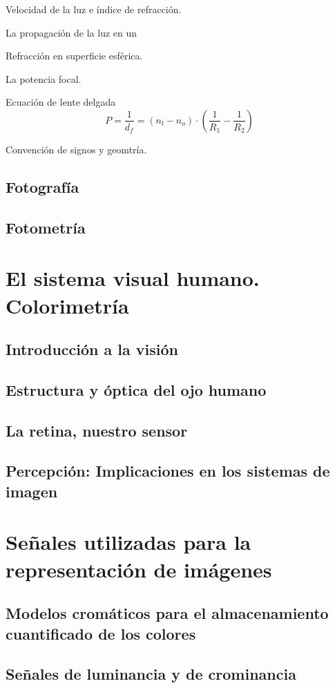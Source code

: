 \documentclass[a4paper]{book}
\begin{document}
Velocidad de la luz e índice de refracción.

La propagación de la luz en un

Refracción en superficie esférica.

La potencia focal.

Ecuación de lente delgada
\[ P=\frac{1}{d_f}=\left( n_l-n_o \right) \cdot \left( \frac{1}{R_1} - \frac{1}{R_2}  \right)  \]

Convención de signos y geomtría.

\section{Fotografía}

\section{Fotometría}

\chapter{El sistema visual humano. Colorimetría}
\section{Introducción a la visión}
\section{Estructura y óptica del ojo humano}
\section{La retina, nuestro sensor}
\section{Percepción: Implicaciones en los sistemas de imagen}

\chapter{Señales utilizadas para la representación de imágenes}
\section{Modelos cromáticos para el almacenamiento cuantificado de los colores}
\section{Señales de luminancia y de crominancia}
\end{document}
